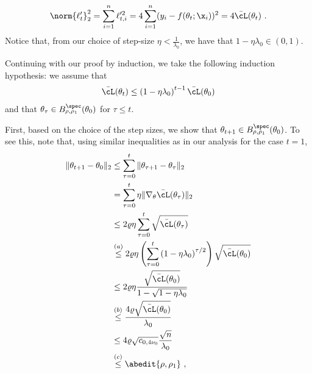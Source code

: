 %
\begin{equation}
\norm{\ell'_t}^2_2 =\sum_{i=1}^n \ell'^2_{t,i} = 4\sum_{i=1}^n (y_i - f(\theta_t;\x_i))^2 = 4 \bar{\cL}(\theta_t)~.
\label{eq:sqlossgrad}
\end{equation}
Notice that, from our choice of step-size $\eta < \frac{1}{\lambda_0}$, we have that $1-\eta\lambda_0\in(0,1)$.


Continuing with our proof by induction, we take the following induction hypothesis: we assume that 
\begin{align}
\bar{\cL}(\theta_t) \leq \left(1- \eta \lambda_0 \right)^{t-1} \bar{\cL}(\theta_0)
\end{align}
and that $\theta_\tau\in B^{\spec}_{\rho,\rho_1}(\theta_0)$ for $\tau\leq t$.

First, based on the choice of the step sizes, we show that $\theta_{t+1} \in B_{\rho,\rho_1}^{\spec}(\theta_0)$. To see this, note that, using similar inequalities as in our analysis for the case $t=1$,
\begin{align*}
\| \theta_{t+1} - \theta_0 \|_2 & \leq \sum_{\tau=0}^{t} \| \theta_{\tau+1} - \theta_{\tau} \|_2 \\
& = \sum_{\tau=0}^t \eta \| \nabla_\theta \bar{\cL}(\theta_{\tau})\|_2 \\
& \leq 2 \varrho \eta   \sum_{\tau=0}^t  \sqrt{\bar{\cL}(\theta_\tau)} \\
& \overset{(a)}{\leq} 2 \varrho \eta   \left(\sum_{\tau=0}^t \left(1 - \eta \lambda_0 \right)^{\tau/2} \right) \sqrt{\bar{\cL}(\theta_0)}\\
& \leq 2 \varrho \eta \frac{\sqrt{\bar{\cL}(\theta_0)}}{1 - \sqrt{1- \eta \lambda_0}} \\
& \overset{(b)}{\leq} \frac{4 \varrho \sqrt{\bar{\cL}(\theta_0)}}{\lambda_0}\\
& \leq 4 \varrho \sqrt{c_{0,4\nu_0}} \frac{\sqrt{n} }{\lambda_0} \\
& \overset{(c)}{\leq} \abedit{\rho, \rho_1}~,
\end{align*}

